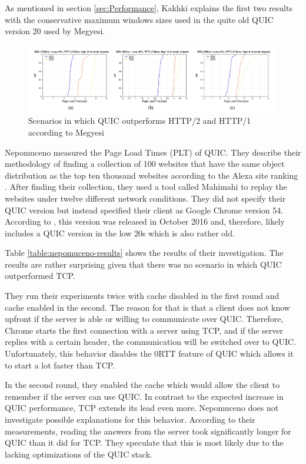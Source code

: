 \documentclass[conference]{IEEEtran}
\begin{document}
As mentioned in section \ref{sec:Performance}, Kakhki explains the first two results with the conservative maximum windows sizes used in the quite old QUIC version 20 used by Megyesi.

\begin{figure}[htbp]
\centerline{\includegraphics[width=\textwidth]{images/Megyesi QUIC wins.png}}
\caption{Scenarios in which QUIC outperforms HTTP/2 and HTTP/1 according to Megyesi \cite{HowQuickIsQuic}}
\label{fig:megyesi-quic-wins}
\end{figure} 

Nepomuceno \cite{Nepomuceno} measured the Page Load Times (PLT) of QUIC. They describe their methodology of finding a collection of 100 websites that have the same object distribution as the top ten thousand websites according to the Alexa site ranking \cite{AlexaRanking}. After finding their collection, they used a tool called Mahimahi to replay the websites under twelve different network conditions. They did not specify their QUIC version but instead specified their client as Google Chrome version 54. According to \cite{ChromeVersionHistory}, this version was released in October 2016 and, therefore, likely includes a QUIC version in the low 20s which is also rather old.

Table \ref{table:nepomuceno-results} shows the results of their investigation. The results are rather surprising given that there was no scenario in which QUIC outperformed TCP. 

They run their experiments twice with cache disabled in the first round and cache enabled in the second. The reason for that is that a client does not know upfront if the server is able or willing to communicate over QUIC. Therefore, Chrome starts the first connection with a server using TCP, and if the server replies with a certain header, the communication will be switched over to QUIC. Unfortunately, this behavior disables the 0RTT feature of QUIC which allows it to start a lot faster than TCP.

In the second round, they enabled the cache which would allow the client to remember if the server can use QUIC. In contrast to the expected increase in QUIC performance, TCP extends its lead even more. Nepomuceno does not investigate possible explanations for this behavior. According to their measurements, reading the answers from the server took significantly longer for QUIC than it did for TCP. They speculate that this is most likely due to the lacking optimizations of the QUIC stack.
\end{document}
